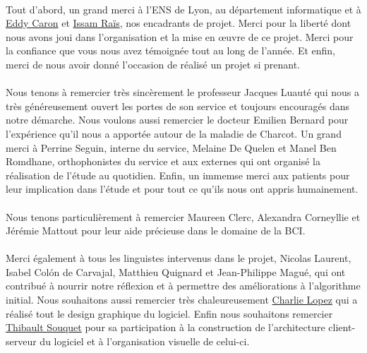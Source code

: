 \documentclass[11pt,a4paper]{article}
\theoremstyle{plain}
\theoremstyle{definition}
\begin{document}
\paragraph{}Tout d'abord, un grand merci à l'ENS de Lyon, au département informatique et à \href{http://graal.ens-lyon.fr/~ecaron/}{Eddy Caron} et \href{http://perso.ens-lyon.fr/issam.rais/}{Issam Raïs}, nos encadrants de projet. Merci pour la liberté dont nous avons joui dans l'organisation et la mise en \oe uvre de ce projet. Merci pour la confiance que vous nous avez témoignée tout au long de l'année.
Et enfin, merci de nous avoir donné l'occasion de réalisé un projet si prenant.

\paragraph{}
Nous tenons à remercier très sincèrement le professeur Jacques Luauté qui nous a très généreusement ouvert les portes de son service et toujours encouragés dans notre démarche.
Nous voulons aussi remercier le docteur Emilien Bernard pour l'expérience qu'il nous a apportée autour de la maladie de Charcot. Un grand merci à Perrine Seguin, interne 
du service, Melaine De Quelen et Manel Ben Romdhane, orthophonistes du service et aux externes qui ont organisé la réalisation de l'étude au quotidien. Enfin, un immemse merci
aux patients pour leur implication dans l'étude et pour tout ce qu'ils nous ont appris humainement.

\paragraph{}
Nous tenons particulièrement à remercier Maureen Clerc, Alexandra Corneyllie et Jérémie Mattout pour leur aide précieuse dans le domaine de la BCI.

\paragraph{}
Merci également à tous les linguistes intervenus dans le projet, Nicolas Laurent, Isabel Colón de Carvajal, Matthieu Quignard et Jean-Philippe Magué, qui ont contribué à nourrir notre réflexion et à permettre 
des améliorations à l'algorithme initial. Nous souhaitons aussi remercier très chaleureusement \href{http://www.charlie-lopez.com/}{Charlie Lopez} 
qui a réalisé tout le design graphique du logiciel. Enfin nous souhaitons remercier \href{http://thibaultsouquet.fr/}{Thibault Souquet} pour sa participation à la construction 
de l'architecture client-serveur du logiciel et à l'organisation visuelle de celui-ci.
\end{document}
